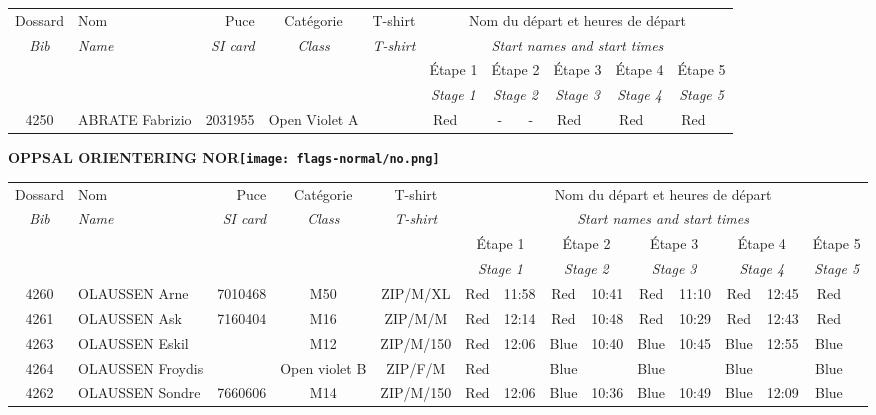 \documentclass{report}
\begin{document}
  \begin{longtable}{|c|l|r|c|c|*{5}{cc|}}
    Dossard & Nom  & Puce    & Catégorie & T-shirt & \multicolumn{10}{c|}{Nom du départ et heures de départ} \\
    \itshape Bib     & \itshape Name & \itshape SI card & \itshape Class  & \itshape  T-shirt  & \multicolumn{10}{c|}{\itshape Start names and start times} \\
    \hline
    & & & & & \multicolumn{2}{c|}{Étape 1} & \multicolumn{2}{c|}{Étape 2} & \multicolumn{2}{c|}{Étape 3} & \multicolumn{2}{c|}{Étape 4} & \multicolumn{2}{c|}{Étape 5} \\
    & & & & & \multicolumn{2}{c|}{\itshape Stage 1} & \multicolumn{2}{c|}{\itshape Stage 2} & \multicolumn{2}{c|}{\itshape Stage 3} & \multicolumn{2}{c|}{\itshape Stage 4} & \multicolumn{2}{c|}{\itshape Stage 5} \\
    \hline
    4250 & ABRATE Fabrizio & 2031955 & Open Violet A &   & Red &   & - &  - & Red &   & Red &   & Red &  \\
  \end{longtable}
\newpage
  \Huge \centering \bfseries OPPSAL ORIENTERING  NOR\normalfont \footnotesize \sffamily \hfill \texttt{[image: flags-normal/no.png]} \newline 
  \begin{longtable}{|c|l|r|c|c|*{5}{cc|}}
    Dossard & Nom  & Puce    & Catégorie & T-shirt & \multicolumn{10}{c|}{Nom du départ et heures de départ} \\
    \itshape Bib     & \itshape Name & \itshape SI card & \itshape Class  & \itshape  T-shirt  & \multicolumn{10}{c|}{\itshape Start names and start times} \\
    \hline
    & & & & & \multicolumn{2}{c|}{Étape 1} & \multicolumn{2}{c|}{Étape 2} & \multicolumn{2}{c|}{Étape 3} & \multicolumn{2}{c|}{Étape 4} & \multicolumn{2}{c|}{Étape 5} \\
    & & & & & \multicolumn{2}{c|}{\itshape Stage 1} & \multicolumn{2}{c|}{\itshape Stage 2} & \multicolumn{2}{c|}{\itshape Stage 3} & \multicolumn{2}{c|}{\itshape Stage 4} & \multicolumn{2}{c|}{\itshape Stage 5} \\
    \hline
    4260 & OLAUSSEN Arne & 7010468 & M50 & ZIP/M/XL & Red & 11:58 & Red & 10:41 & Red & 11:10 & Red & 12:45 & Red &  \\
    4261 & OLAUSSEN Ask & 7160404 & M16 & ZIP/M/M & Red & 12:14 & Red & 10:48 & Red & 10:29 & Red & 12:43 & Red &  \\
    4263 & OLAUSSEN Eskil &  & M12 & ZIP/M/150 & Red & 12:06 & Blue & 10:40 & Blue & 10:45 & Blue & 12:55 & Blue &  \\
    4264 & OLAUSSEN Froydis &  & Open violet B & ZIP/F/M & Red &   & Blue &   & Blue &   & Blue &   & Blue &  \\
    4262 & OLAUSSEN Sondre & 7660606 & M14 & ZIP/M/150 & Red & 12:06 & Blue & 10:36 & Blue & 10:49 & Blue & 12:09 & Blue &  \\
  \end{longtable}
\end{document}
